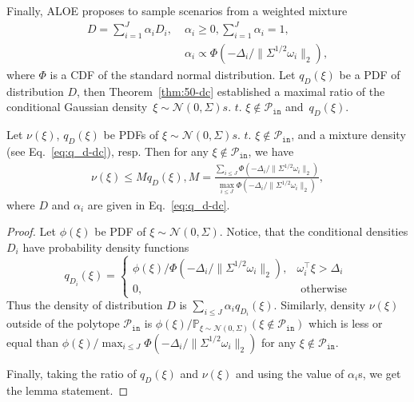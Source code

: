 Finally, ALOE proposes to sample scenarios from a weighted mixture
\begin{align}\label{eq:q_d-dc}
  D = \sum_{i=1}^J \alpha_i D_i, \; & \alpha_i \ge 0, \sum_{i=1}^J \alpha_i = 1,\nonumber \\
  & \alpha_i \propto \Phi(-\Delta_i/\|\Sigma^{1/2}\omega_i\|_2),
\end{align}
where $\Phi$ is a CDF of the standard normal distribution. Let $q_D(\xi)$ be a PDF of distribution $D$, then Theorem~\ref{thm:50-dc} established a maximal ratio of the conditional Gaussian density~$\xi\sim\mathcal{N}(0, \Sigma) \textit{s. t. } \xi\not\in\mathcal{P}_{\texttt{in}}$ and~$q_D(\xi)$. 

\begin{theorem}\label{thm:50-dc}
Let $\nu(\xi)$, $q_D(\xi)$ be PDFs  of $\xi\sim\mathcal{N}(0, \Sigma) \textit{s. t. } \xi\not\in\mathcal{P}_{\texttt{in}}$, and a mixture density (see Eq.~\eqref{eq:q_d-dc}), resp. Then for any $\xi\not\in\mathcal{P}_{\texttt{in}}$, we have
\begin{align}\label{eq:M-dc}
  \nu(\xi) \le M q_D(\xi),  
  M = \frac{\sum_{i\le J} \Phi(-\Delta_i/\|\Sigma^{1/2}\omega_i\|_2)
  }{\max_{i\le J}\Phi(-\Delta_i/\|\Sigma^{1/2}\omega_i\|_2)}, 
\end{align}
where $D$ and $\alpha_i$ are given in Eq.~\eqref{eq:q_d-dc}.
\end{theorem}
\begin{proof}
Let $\phi(\xi)$ be PDF of $\xi\sim\mathcal{N}(0, \Sigma)$. Notice, that the conditional densities $D_i$ have probability density functions 
\[q_{D_i}(\xi) = \begin{cases}
\phi(\xi)/\Phi(-\Delta_i/\|\Sigma^{1/2}\omega_i\|_2), & \omega_i^\top \xi > \Delta_i\\
0, & \text{ otherwise}
\end{cases}
\]
Thus the density of distribution $D$ is $\sum_{i\le J} \alpha_iq_{D_i}(\xi)$. Similarly, density $\nu(\xi)$ outside of the polytope $\mathcal{P}_{\texttt{in}}$ is $\phi(\xi)/\mathbb{P}_{\xi\sim \mathcal{N}(0, \Sigma)}(\xi\not\in \mathcal{P}_{\texttt{in}})$ which is less or equal than 
$\phi(\xi)/\max_{i\le J}\Phi(-\Delta_i/\|\Sigma^{1/2}\omega_i\|_2)$ for any $\xi \not\in \mathcal{P}_{\texttt{in}}$. 

Finally, taking the ratio of $q_D(\xi)$ and $\nu(\xi)$ and using the value of $\alpha_i$s, we get the lemma statement.
\end{proof}

